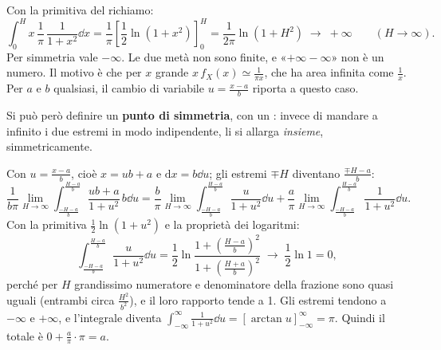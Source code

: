 
\begin{dimostrazione}[con $a = 0$ e $b = 1$]
 Con la primitiva del richiamo:
\[ \int_0^H x\, \frac{1}{\pi}\, \frac{1}{1 + x^2} \dd x = \frac{1}{\pi} \left[ \frac12 \ln(1 + x^2) \right]_0^H =
   \frac{1}{2\pi} \ln(1 + H^2) \;\longrightarrow\; +\infty \qquad (H \to \infty) . \]
 Per simmetria vale $-\infty$.
 Le due metà non sono finite, e «$+\infty - \infty$» non è un numero. Il motivo è che per $x$ grande
$x\, f_X(x) \simeq \frac{1}{\pi x}$, che ha area infinita come $\frac1x$. Per $a$ e $b$ qualsiasi, il cambio di variabile
$u = \frac{x - a}{b}$ riporta a questo caso.
\end{dimostrazione}

Si può però definire un \textbf{punto di simmetria}, con un : invece di mandare a
infinito i due estremi in modo indipendente, li si allarga \emph{insieme}, simmetricamente.


\begin{dimostrazione}
 Con $u = \frac{x - a}{b}$, cioè $x = ub + a$ e $\mathrm{d}x = b \dd u$; gli estremi
$\mp H$ diventano $\frac{\mp H - a}{b}$:
\[ \frac{1}{b\pi} \lim_{H \to \infty} \int_{\frac{-H - a}{b}}^{\frac{H - a}{b}} \frac{ub + a}{1 + u^2}\, b \dd u =
   \frac{b}{\pi} \lim_{H \to \infty} \int_{\frac{-H - a}{b}}^{\frac{H - a}{b}} \frac{u}{1 + u^2} \dd u +
   \frac{a}{\pi} \lim_{H \to \infty} \int_{\frac{-H - a}{b}}^{\frac{H - a}{b}} \frac{1}{1 + u^2} \dd u . \]
 Con la primitiva $\frac12 \ln(1 + u^2)$ e la proprietà dei logaritmi:
\[ \int_{\frac{-H - a}{b}}^{\frac{H - a}{b}} \frac{u}{1 + u^2} \dd u = \frac12 \ln\frac{1 + \left(\frac{H - a}{b}\right)^2}{1 +
   \left(\frac{H + a}{b}\right)^2} \;\longrightarrow\; \frac12 \ln 1 = 0 , \]
perché per $H$ grandissimo numeratore e denominatore della frazione sono quasi uguali (entrambi circa
$\frac{H^2}{b^2}$), e il loro rapporto tende a 1.
 Gli estremi tendono a $-\infty$ e $+\infty$, e l'integrale diventa
$\int_{-\infty}^{\infty} \frac{1}{1 + u^2} \dd u = \left[ \arctan u \right]_{-\infty}^{\infty} = \pi$. Quindi il totale
è $0 + \frac{a}{\pi} \cdot \pi = a$.
\end{dimostrazione}

